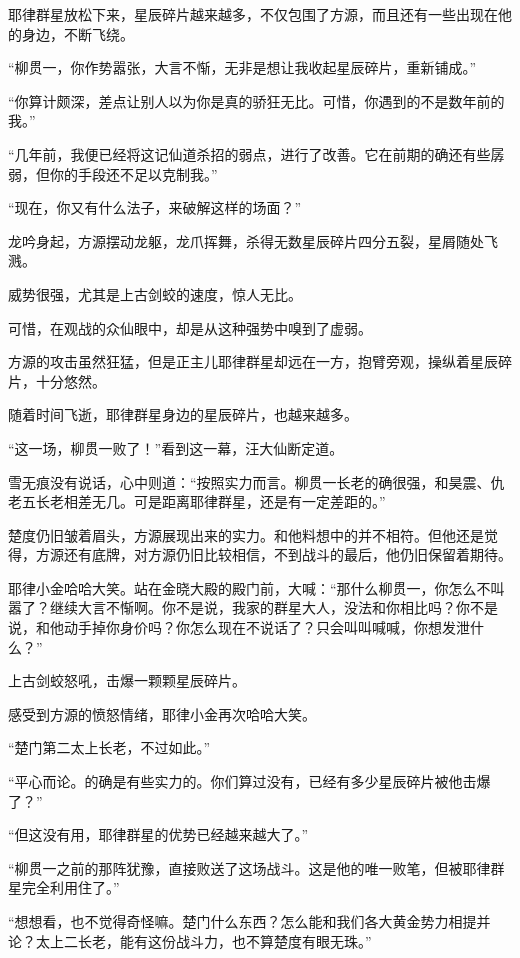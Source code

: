 \begin{this_body}
耶律群星放松下来，星辰碎片越来越多，不仅包围了方源，而且还有一些出现在他的身边，不断飞绕。

“柳贯一，你作势嚣张，大言不惭，无非是想让我收起星辰碎片，重新铺成。”

“你算计颇深，差点让别人以为你是真的骄狂无比。可惜，你遇到的不是数年前的我。”

“几年前，我便已经将这记仙道杀招的弱点，进行了改善。它在前期的确还有些孱弱，但你的手段还不足以克制我。”

“现在，你又有什么法子，来破解这样的场面？”

龙吟身起，方源摆动龙躯，龙爪挥舞，杀得无数星辰碎片四分五裂，星屑随处飞溅。

威势很强，尤其是上古剑蛟的速度，惊人无比。

可惜，在观战的众仙眼中，却是从这种强势中嗅到了虚弱。

方源的攻击虽然狂猛，但是正主儿耶律群星却远在一方，抱臂旁观，操纵着星辰碎片，十分悠然。

随着时间飞逝，耶律群星身边的星辰碎片，也越来越多。

“这一场，柳贯一败了！”看到这一幕，汪大仙断定道。

雪无痕没有说话，心中则道：“按照实力而言。柳贯一长老的确很强，和昊震、仇老五长老相差无几。可是距离耶律群星，还是有一定差距的。”

楚度仍旧皱着眉头，方源展现出来的实力。和他料想中的并不相符。但他还是觉得，方源还有底牌，对方源仍旧比较相信，不到战斗的最后，他仍旧保留着期待。

耶律小金哈哈大笑。站在金晓大殿的殿门前，大喊：“那什么柳贯一，你怎么不叫嚣了？继续大言不惭啊。你不是说，我家的群星大人，没法和你相比吗？你不是说，和他动手掉你身价吗？你怎么现在不说话了？只会叫叫喊喊，你想发泄什么？”

上古剑蛟怒吼，击爆一颗颗星辰碎片。

感受到方源的愤怒情绪，耶律小金再次哈哈大笑。

“楚门第二太上长老，不过如此。”

“平心而论。的确是有些实力的。你们算过没有，已经有多少星辰碎片被他击爆了？”

“但这没有用，耶律群星的优势已经越来越大了。”

“柳贯一之前的那阵犹豫，直接败送了这场战斗。这是他的唯一败笔，但被耶律群星完全利用住了。”

“想想看，也不觉得奇怪嘛。楚门什么东西？怎么能和我们各大黄金势力相提并论？太上二长老，能有这份战斗力，也不算楚度有眼无珠。”


\end{this_body}
